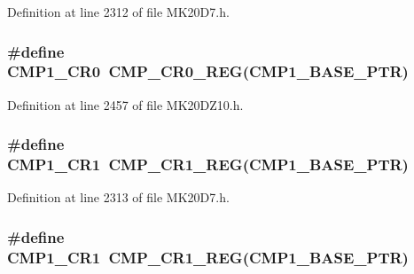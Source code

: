 Definition at line 2312 of file M\+K20\+D7.\+h.

\subsubsection[{\texorpdfstring{C\+M\+P1\+\_\+\+C\+R0}{CMP1_CR0}}]{\setlength{\rightskip}{0pt plus 5cm}\#define C\+M\+P1\+\_\+\+C\+R0~{\bf C\+M\+P\+\_\+\+C\+R0\+\_\+\+R\+EG}({\bf C\+M\+P1\+\_\+\+B\+A\+S\+E\+\_\+\+P\+TR})}\hypertarget{group___c_m_p___register___accessor___macros_gaa82475a4569fb842d73f762929acfa98}{}\label{group___c_m_p___register___accessor___macros_gaa82475a4569fb842d73f762929acfa98}


Definition at line 2457 of file M\+K20\+D\+Z10.\+h.

\subsubsection[{\texorpdfstring{C\+M\+P1\+\_\+\+C\+R1}{CMP1_CR1}}]{\setlength{\rightskip}{0pt plus 5cm}\#define C\+M\+P1\+\_\+\+C\+R1~{\bf C\+M\+P\+\_\+\+C\+R1\+\_\+\+R\+EG}({\bf C\+M\+P1\+\_\+\+B\+A\+S\+E\+\_\+\+P\+TR})}\hypertarget{group___c_m_p___register___accessor___macros_ga911f6bea29d7cb4cc6381004d51663ea}{}\label{group___c_m_p___register___accessor___macros_ga911f6bea29d7cb4cc6381004d51663ea}


Definition at line 2313 of file M\+K20\+D7.\+h.

\subsubsection[{\texorpdfstring{C\+M\+P1\+\_\+\+C\+R1}{CMP1_CR1}}]{\setlength{\rightskip}{0pt plus 5cm}\#define C\+M\+P1\+\_\+\+C\+R1~{\bf C\+M\+P\+\_\+\+C\+R1\+\_\+\+R\+EG}({\bf C\+M\+P1\+\_\+\+B\+A\+S\+E\+\_\+\+P\+TR})}\hypertarget{group___c_m_p___register___accessor___macros_ga911f6bea29d7cb4cc6381004d51663ea}{}\label{group___c_m_p___register___accessor___macros_ga911f6bea29d7cb4cc6381004d51663ea}


